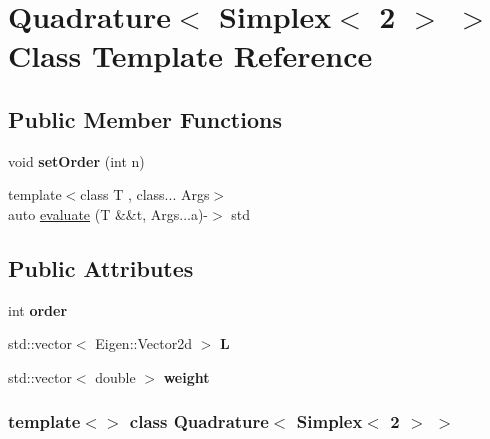 \hypertarget{class_quadrature_3_01_simplex_3_012_01_4_01_4}{
\section{Quadrature$<$ Simplex$<$ 2 $>$ $>$ Class Template Reference}
\label{class_quadrature_3_01_simplex_3_012_01_4_01_4}
}
\subsection*{Public Member Functions}
\begin{DoxyCompactItemize}
\item 
\hypertarget{class_quadrature_3_01_simplex_3_012_01_4_01_4_a36cabdbc40d489004df7f10630c1edda}{
void {\bfseries setOrder} (int n)}
\label{class_quadrature_3_01_simplex_3_012_01_4_01_4_a36cabdbc40d489004df7f10630c1edda}

\item 
{\footnotesize template$<$class T , class... Args$>$ }\\auto \hyperlink{class_quadrature_3_01_simplex_3_012_01_4_01_4_a153826e764e0b4662abf548637c760bd}{evaluate} (T \&\&t, Args...a)-\/$>$ std
\end{DoxyCompactItemize}
\subsection*{Public Attributes}
\begin{DoxyCompactItemize}
\item 
\hypertarget{class_quadrature_3_01_simplex_3_012_01_4_01_4_a4bc28de54ec9827109403f6e59259301}{
int {\bfseries order}}
\label{class_quadrature_3_01_simplex_3_012_01_4_01_4_a4bc28de54ec9827109403f6e59259301}

\item 
\hypertarget{class_quadrature_3_01_simplex_3_012_01_4_01_4_a97c6a305b9992a5e89741d5c89b936d9}{
std::vector$<$ Eigen::Vector2d $>$ {\bfseries L}}
\label{class_quadrature_3_01_simplex_3_012_01_4_01_4_a97c6a305b9992a5e89741d5c89b936d9}

\item 
\hypertarget{class_quadrature_3_01_simplex_3_012_01_4_01_4_af6f1a54cbe888843242eff1cd118194d}{
std::vector$<$ double $>$ {\bfseries weight}}
\label{class_quadrature_3_01_simplex_3_012_01_4_01_4_af6f1a54cbe888843242eff1cd118194d}

\end{DoxyCompactItemize}
\subsubsection*{template$<$$>$ class Quadrature$<$ Simplex$<$ 2 $>$ $>$}



